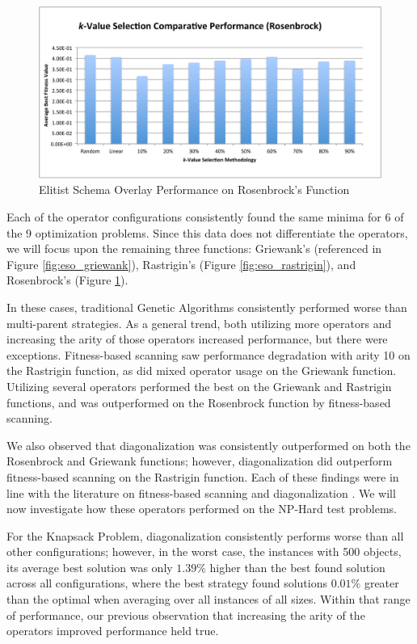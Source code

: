 \begin{figure}[htbp]
\centering
\includegraphics[scale=0.60]{charts/ESO_Rosenbrock.pdf}
\caption{Elitist Schema Overlay Performance on Rosenbrock's Function}
\label{fig:eso_rosenbrock}
\end{figure}

Each of the operator configurations consistently found the same minima for 6 of the 9 optimization problems. Since this data does not differentiate the operators, we will focus upon the remaining three functions: Griewank's (referenced in Figure \ref{fig:eso_griewank}), Rastrigin's (Figure \ref{fig:eso_rastrigin}), and Rosenbrock's (Figure \ref{fig:eso_rosenbrock}). 

In these cases, traditional Genetic Algorithms consistently performed worse than multi-parent strategies. As a general trend, both utilizing more operators and increasing the arity of those operators increased performance, but there were exceptions. Fitness-based scanning saw performance degradation with arity 10 on the Rastrigin function, as did mixed operator usage on the Griewank function. Utilizing several operators performed the best on the Griewank and Rastrigin functions, and was outperformed on the Rosenbrock function by fitness-based scanning.

We also observed that diagonalization was consistently outperformed on both the Rosenbrock and Griewank functions; however, diagonalization did outperform fitness-based scanning on the Rastrigin function. Each of these findings were in line with the literature on fitness-based scanning and diagonalization \cite{Eiben94, Eiben95}. We will now investigate how these operators performed on the NP-Hard test problems.

%
%

For the Knapsack Problem, diagonalization consistently performs worse than all other configurations; however, in the worst case, the instances with 500 objects, its average best solution was only $1.39\%$ higher than the best found solution across all configurations, where the best strategy found solutions $0.01\%$ greater than the optimal when averaging over all instances of all sizes. Within that range of performance, our previous observation that increasing the arity of the operators improved performance held true.

